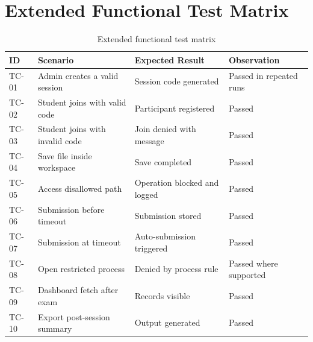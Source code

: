 \documentclass[12pt,a4paper]{report}
\begin{document}
	\section{Extended Functional Test Matrix}
	\begin{table}[htbp]
		\centering
		\caption{Extended functional test matrix}
		\begin{tabular}{|p{}|p{}|p{}|p{}|}
			\hline
			\textbf{ID} & \textbf{Scenario} & \textbf{Expected Result} & \textbf{Observation} \\
			\hline
			TC-01 & Admin creates a valid session & Session code generated & Passed in repeated runs \\
			\hline
			TC-02 & Student joins with valid code & Participant registered & Passed \\
			\hline
			TC-03 & Student joins with invalid code & Join denied with message & Passed \\
			\hline
			TC-04 & Save file inside workspace & Save completed & Passed \\
			\hline
			TC-05 & Access disallowed path & Operation blocked and logged & Passed \\
			\hline
			TC-06 & Submission before timeout & Submission stored & Passed \\
			\hline
			TC-07 & Submission at timeout & Auto-submission triggered & Passed \\
			\hline
			TC-08 & Open restricted process & Denied by process rule & Passed where supported \\
			\hline
			TC-09 & Dashboard fetch after exam & Records visible & Passed \\
			\hline
			TC-10 & Export post-session summary & Output generated & Passed \\
			\hline
		\end{tabular}
	\end{table}
	
\end{document}
